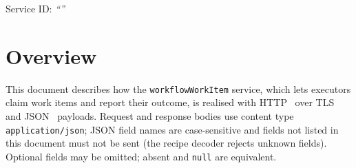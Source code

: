 \documentclass[a4paper]{arrowhead}
\begin{document}
\ArrowheadSetup

\begin{center}
  \vspace*{1cm}
  \huge{\arrowtitle}

  \vspace*{0.2cm}
  \LARGE{\arrowtype}
  \vspace*{1cm}

  \Large{Service ID: \textit{``\arrowid''}}
  \vspace*{\fill}

  

  \vspace*{1cm}
  \vspace*{\fill}

  \begin{abstract}
    This document describes the HTTP/TLS/JSON interface of the \texttt{workflow\allowbreak{}Work\allowbreak{}Item} service of the Eclipse Arrowhead workflow support systems, service version 1.0.0, documentation edition 5.4.0. It realises the abstract operations of the \texttt{workflow\allowbreak{}Work\allowbreak{}Item} SD.
  \end{abstract}

  \vspace*{1cm}
\end{center}

\newpage

\tableofcontents
\newpage

\section{Overview}
\label{sec:overview}
This document describes how the \texttt{workflow\allowbreak{}Work\allowbreak{}Item} service, which lets executors claim work items and report their outcome, is realised with HTTP~\cite{rfc9110}
over TLS~\cite{rfc8446} and JSON~\cite{rfc8259} payloads. Request and response bodies use content type
\texttt{application/\allowbreak{}json}; JSON field names are case-sensitive and fields not listed in this document must not be sent
(the recipe decoder rejects unknown fields). Optional fields may be omitted; absent and \texttt{null} are equivalent.
\end{document}
